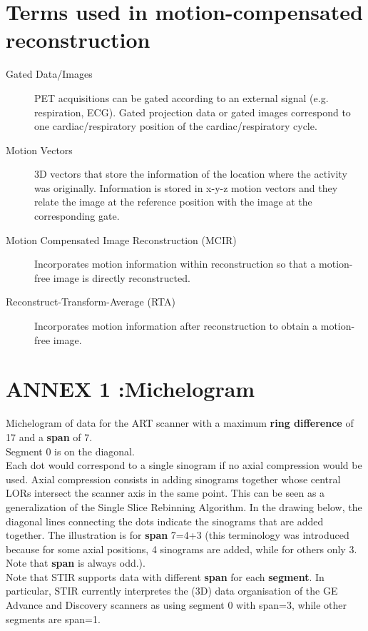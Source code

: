 \documentclass{article}
\begin{document}
\section*{Terms used in motion-compensated reconstruction}

\begin{description}
\item[Gated Data/Images]
PET acquisitions can be gated according to an external signal (e.g. respiration, ECG). Gated projection data or gated images correspond to one cardiac/respiratory position of the cardiac/respiratory cycle. 


\item[Motion Vectors]
3D vectors that store the information of the location where the activity was originally. Information is stored in x-y-z motion vectors and they relate the image at the reference position with the image at the corresponding gate.


\item[Motion Compensated Image Reconstruction (MCIR)]
Incorporates motion information within reconstruction so that a motion-free image is directly reconstructed. 

\item[Reconstruct-Transform-Average (RTA)]
Incorporates motion information after reconstruction to obtain a motion-free image.
\end{description}

\newpage
 \section*{ ANNEX 1 :Michelogram}

Michelogram of data for the ART scanner with a maximum \textbf{ring 
difference} of 17 and a \textbf{span} of 7. \\
Segment 0 is on the diagonal. \\
Each dot would correspond to a single sinogram if no axial compression 
would be used. Axial compression consists in adding sinograms 
together whose central LORs intersect the scanner axis 
in the same point. This can be seen as a generalization of the 
Single Slice Rebinning Algorithm. In the drawing below, the diagonal 
lines connecting the dots indicate the sinograms that are added 
together. The illustration is for \textbf{span} 7=4+3 (this terminology 
was introduced because for some axial positions, 4 sinograms 
are added, while for others only 3. Note that \textbf{span} is always 
odd.).\\
Note that STIR supports data with different \textbf{span} for each \textbf{segment}. 
In particular, STIR currently interpretes the (3D) data organisation of the
GE Advance and Discovery scanners as using segment 0 with span=3, while 
other segments are span=1.
\end{document}
